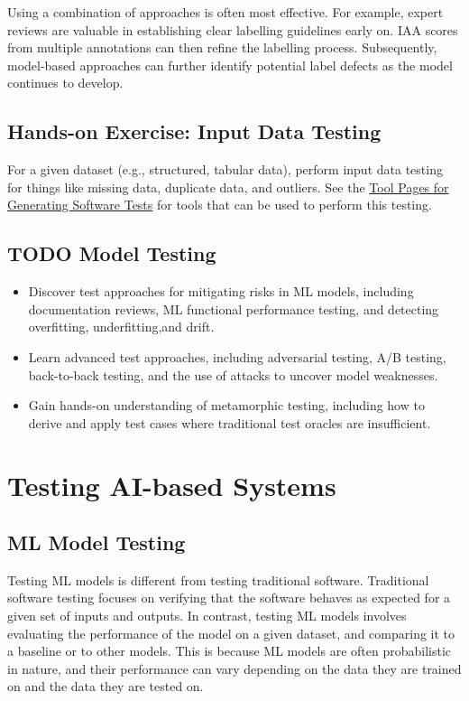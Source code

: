 \documentclass[
  letterpaper,
  DIV=11,
  numbers=noendperiod,
  oneside]{scrreprt}
\begin{document}
\begin{tcolorbox}
Using a combination of approaches is often most effective. For example,
expert reviews are valuable in establishing clear labelling guidelines
early on. IAA scores from multiple annotations can then refine the
labelling process. Subsequently, model-based approaches can further
identify potential label defects as the model continues to develop.

\section{Hands-on Exercise: Input Data
Testing}\label{hands-on-exercise-input-data-testing}

For a given dataset (e.g., structured, tabular data), perform input data
testing for things like missing data, duplicate data, and outliers. See
the \href{Hands-On\%20Exercises.qmd}{Tool Pages for Generating Software
Tests} for tools that can be used to perform this testing.

\section{TODO Model Testing}\label{sec-ml-model-testing}

\begin{itemize}
\item
  Discover test approaches for mitigating risks in ML models, including
  documentation reviews, ML functional performance testing, and
  detecting overfitting, underfitting,and drift.
\item
  Learn advanced test approaches, including adversarial testing, A/B
  testing, back-to-back testing, and the use of attacks to uncover model
  weaknesses.
\item
  Gain hands-on understanding of metamorphic testing, including how to
  derive and apply test cases where traditional test oracles are
  insufficient.
\end{itemize}

\chapter{Testing AI-based Systems}\label{testing-ai-based-systems-1}

\section{ML Model Testing}\label{ml-model-testing}

Testing ML models is different from testing traditional software.
Traditional software testing focuses on verifying that the software
behaves as expected for a given set of inputs and outputs. In contrast,
testing ML models involves evaluating the performance of the model on a
given dataset, and comparing it to a baseline or to other models. This
is because ML models are often probabilistic in nature, and their
performance can vary depending on the data they are trained on and the
data they are tested on.


\end{tcolorbox}
\end{document}
